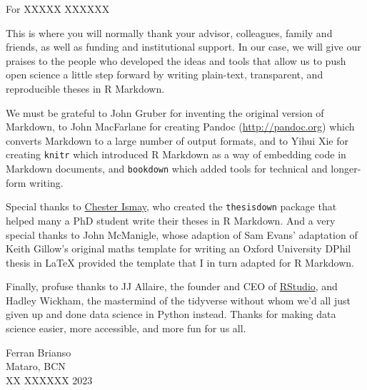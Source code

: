 \documentclass[a4paper, nobind]{templates/ociamthesis}
\begin{document}
\begin{romanpages}

\maketitle

\begin{dedication}
  For XXXXX XXXXXX
\end{dedication}



\begin{acknowledgements}
 	This is where you will normally thank your advisor, colleagues, family and friends, as well as funding and institutional support. In our case, we will give our praises to the people who developed the ideas and tools that allow us to push open science a little step forward by writing plain-text, transparent, and reproducible theses in R Markdown.

  We must be grateful to John Gruber for inventing the original version of Markdown, to John MacFarlane for creating Pandoc (\url{http://pandoc.org}) which converts Markdown to a large number of output formats, and to Yihui Xie for creating \texttt{knitr} which introduced R Markdown as a way of embedding code in Markdown documents, and \texttt{bookdown} which added tools for technical and longer-form writing.

  Special thanks to \href{http://chester.rbind.io}{Chester Ismay}, who created the \texttt{thesisdown} package that helped many a PhD student write their theses in R Markdown. And a very special thanks to John McManigle, whose adaption of Sam Evans' adaptation of Keith Gillow's original maths template for writing an Oxford University DPhil thesis in LaTeX provided the template that I in turn adapted for R Markdown.

  Finally, profuse thanks to JJ Allaire, the founder and CEO of \href{http://rstudio.com}{RStudio}, and Hadley Wickham, the mastermind of the tidyverse without whom we'd all just given up and done data science in Python instead. Thanks for making data science easier, more accessible, and more fun for us all.

  \begin{flushright}
  Ferran Brianso \\
  Mataro, BCN \\
  XX XXXXXX 2023
  \end{flushright}
\end{acknowledgements}




\end{romanpages}
\end{document}
